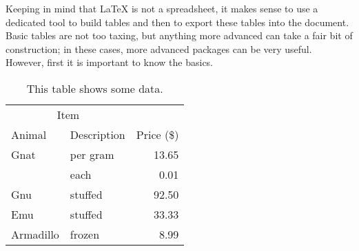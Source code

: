 Keeping in mind that LaTeX is not a spreadsheet, it makes sense to use a dedicated tool to build tables
and then to export these tables into the document.
Basic tables are not too taxing, but anything more advanced can take a fair bit of construction;
in these cases, more advanced packages can be very useful.
However, first it is important to know the basics.

\begin{table}
	\centering
	\caption{This table shows some data.}
	\label{tab:This table shows some data}
	\begin{tabular}{llr}
		\hline
		\multicolumn{2}{c}{Item} \\
		\cline{1-2}
		Animal    & Description & Price (\$) \\
		\hline
		Gnat      & per gram    & 13.65      \\
		& each        & 0.01       \\
		Gnu       & stuffed     & 92.50      \\
		Emu       & stuffed     & 33.33      \\
		Armadillo & frozen      & 8.99       \\
		\hline
	\end{tabular}
\end{table}
















